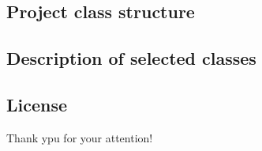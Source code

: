 \documentclass{beamer}
\newcommand{\backupbegin}{
   \newcounter{finalframe}
   \setcounter{finalframe}{\value{framenumber}}
}
\newcommand{\backupend}{
   \setcounter{framenumber}{\value{finalframe}}
}
\begin{document}
\subsection{Project class structure}
\subsection{Description of selected classes}
\subsection{License}

\begin{frame}
\vfill
\centering
\Huge{Thank ypu for your attention!}

\vfill
\end{frame}

\end{document}
